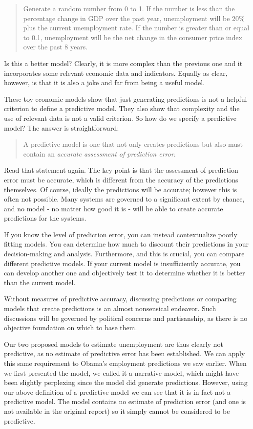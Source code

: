 \documentclass[]{memoir}
\begin{document}
\begin{quote}
Generate a random number from 0 to 1. If the number is less than the
percentage change in GDP over the past year, unemployment will be 20\%
plus the current unemployment rate. If the number is greater than or
equal to 0.1, unemployment will be the net change in the consumer price
index over the past 8 years.
\end{quote}

Is this a better model? Clearly, it is more complex than the previous
one and it incorporates some relevant economic data and indicators.
Equally as clear, however, is that it is also a joke and far from being
a useful model.

These toy economic models show that just generating predictions is not a
helpful criterion to define a predictive model. They also show that
complexity and the use of relevant data is not a valid criterion. So how
do we specify a predictive model? The answer is straightforward:

\begin{quote}
A predictive model is one that not only creates predictions but also
must contain an \emph{accurate assessment of prediction error}.
\end{quote}

Read that statement again. The key point is that the assessment of
prediction error must be accurate, which is different from the accuracy
of the predictions themselves. Of course, ideally the predictions will
be accurate; however this is often not possible. Many systems are
governed to a significant extent by chance, and no model - no matter how
good it is - will be able to create accurate predictions for the
systems.

If you know the level of prediction error, you can instead contextualize
poorly fitting models. You can determine how much to discount their
predictions in your decision-making and analysis. Furthermore, and this
is crucial, you can compare different predictive models. If your current
model is insufficiently accurate, you can develop another one and
objectively test it to determine whether it is better than the current
model.

Without measures of predictive accuracy, discussing predictions or
comparing models that create predictions is an almost nonsensical
endeavor. Such discussions will be governed by political concerns and
partisanship, as there is no objective foundation on which to base them.

Our two proposed models to estimate unemployment are thus clearly not
predictive, as no estimate of predictive error has been established. We
can apply this same requirement to Obama's employment predictions we saw
earlier. When we first presented the model, we called it a narrative
model, which might have been slightly perplexing since the model did
generate predictions. However, using our above definition of a
predictive model we can see that it is in fact not a predictive model.
The model contains no estimate of prediction error (and one is not
available in the original report) so it simply cannot be considered to
be predictive.
\end{document}
